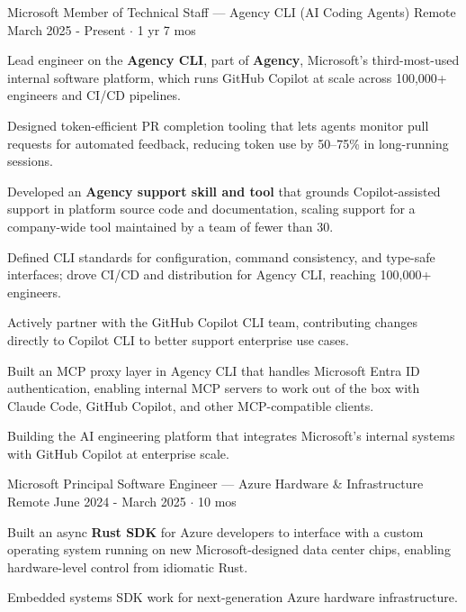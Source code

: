 \documentclass[11pt, a4paper]{awesome-cv}
\begin{document}
\begin{cventries}

  \cventry
    {Microsoft}
    {Member of Technical Staff — Agency CLI (AI Coding Agents)}
    {Remote}
    {March 2025 - Present $\cdot$ 1 yr 7 mos}
    {
      \begin{cvitems}
        \item Lead engineer on the \textbf{Agency CLI}, part of \textbf{Agency}, Microsoft's third-most-used internal software platform, which runs GitHub Copilot at scale across 100,000+ engineers and CI/CD pipelines.
        \item Designed token-efficient PR completion tooling that lets agents monitor pull requests for automated feedback, reducing token use by 50--75\% in long-running sessions.
        \item Developed an \textbf{Agency support skill and tool} that grounds Copilot-assisted support in platform source code and documentation, scaling support for a company-wide tool maintained by a team of fewer than 30.
        \item Defined CLI standards for configuration, command consistency, and type-safe interfaces; drove CI/CD and distribution for Agency CLI, reaching 100,000+ engineers.
        \item Actively partner with the GitHub Copilot CLI team, contributing changes directly to Copilot CLI to better support enterprise use cases.
        \item Built an MCP proxy layer in Agency CLI that handles Microsoft Entra ID authentication, enabling internal MCP servers to work out of the box with Claude Code, GitHub Copilot, and other MCP-compatible clients.
      \end{cvitems}
    }
    {Building the AI engineering platform that integrates Microsoft's internal systems with GitHub Copilot at enterprise scale.}

  \cventry
    {Microsoft}
    {Principal Software Engineer — Azure Hardware \& Infrastructure}
    {Remote}
    {June 2024 - March 2025 $\cdot$ 10 mos}
    {
      \begin{cvitems}
        \item Built an async \textbf{Rust SDK} for Azure developers to interface with a custom operating system running on new Microsoft-designed data center chips, enabling hardware-level control from idiomatic Rust.
      \end{cvitems}
    }
    {Embedded systems SDK work for next-generation Azure hardware infrastructure.}


\end{cventries}
\end{document}
